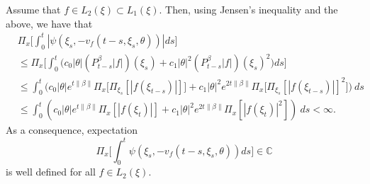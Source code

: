 \documentclass[12pt, a4paper]{amsart}
\theoremstyle{definition}
\numberwithin{equation}{section}
\begin{document}
    Assume that $f \in L_2(\xi) \subset L_1(\xi)$.
    Then, using Jensen's inequality and the above, we have that
\begin{align}
\label{eq: domination of psi(v)}
    &\Pi_x\Big[\int_0^t |\psi(\xi_s,-v_f(t-s,\xi_s,\theta))|ds\Big]
\\&\leq \Pi_x\Big[\int_0^t \big(c_0|\theta| (P_{t-s}^\beta|f|)(\xi_s)+c_1|\theta|^2(P_{t-s}^\beta|f|)(\xi_s)^2\big)ds\Big]
\\ &\leq \int_0^t \big(c_0|\theta|e^{t\|\beta\|}\Pi_x \big[ \Pi_{\xi_s}[|f(\xi_{t-s})|] \big]+c_1|\theta|^2e^{2t\|\beta\|}\Pi_x \big[ \Pi_{\xi_s}[|f (\xi_{t-s})|]^2 \big]\big)~ds
\\ &\leq \int_0^t (c_0|\theta|e^{t\|\beta\|}\Pi_x [ |f(\xi_{t})|]+c_1|\theta|^2e^{2t\|\beta\|}\Pi_x [ |f (\xi_{t})|^2 ])~ds < \infty.
\end{align}
    As a consequence, expectation
\[
    \Pi_x\Big[\int_0^t \psi(\xi_s,-v_f(t-s,\xi_s,\theta))ds\Big]
    \in \mathbb C
\]
    is well defined for all $f\in L_2(\xi)$.
\end{document}
